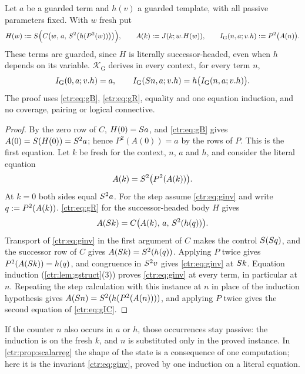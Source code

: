 \begin{theorem}\label{ctr:thm:giter}
Let $a$ be a guarded term and $h(v)$ a guarded template, with all passive parameters fixed.
With $w$ fresh put
\[
 H(w)\mathrel{:=}S\Bigl(C\bigl(w,\,a,\,S^2\bigl(h(P^2(w))\bigr)\bigr)\Bigr),\qquad
 A(k)\mathrel{:=} J(k;w.H(w)),\qquad
 I_{\mathrm G}(n,a;v.h)\mathrel{:=} P^2\bigl(A(n)\bigr).
\]
These terms are guarded, since $H$ is literally successor-headed, even when $h$ depends on
its variable. $\mathcal K_{\mathrm G}$ derives in every context, for every term $n$,
\begin{equation}\label{ctr:eq:gIC}
 I_{\mathrm G}(0,a;v.h)=a,\qquad I_{\mathrm G}(S n,a;v.h)=h\bigl(I_{\mathrm G}(n,a;v.h)\bigr).
\end{equation}
The proof uses \eqref{ctr:eq:gB}, \eqref{ctr:eq:gR}, equality and one equation induction,
and no coverage, pairing or logical connective.
\end{theorem}
\begin{proof}
By the zero row of $C$, $H(0)=S a$, and \eqref{ctr:eq:gB} gives $A(0)=S(H(0))=S^2a$;
hence $P^2(A(0))=a$ by the rows of $P$. This is the first equation. Let $k$ be fresh for
the context, $n$, $a$ and $h$, and consider the literal equation
\begin{equation}\label{ctr:eq:ginv}
 A(k)=S^2\bigl(P^2(A(k))\bigr).
\end{equation}
At $k=0$ both sides equal $S^2a$. For the step assume \eqref{ctr:eq:ginv} and write
$q\mathrel{:=} P^2(A(k))$. \eqref{ctr:eq:gR} for the successor-headed body $H$ gives
\begin{equation}\label{ctr:eq:gstep}
 A(S k)=C\bigl(A(k),\,a,\,S^2(h(q))\bigr).
\end{equation}
Transport of \eqref{ctr:eq:ginv} in the first argument of $C$ makes the control
$S(S q)$, and the successor row of $C$ gives $A(S k)=S^2(h(q))$. Applying $P$
twice gives $P^2(A(S k))=h(q)$, and congruence in $S^2v$ gives \eqref{ctr:eq:ginv} at
$S k$. Equation induction (\cref{ctr:lem:gstruct}(3)) proves \eqref{ctr:eq:ginv} at every
term, in particular at $n$. Repeating the step calculation with this instance at $n$ in
place of the induction hypothesis gives $A(S n)=S^2(h(P^2(A(n))))$, and applying $P$
twice gives the second equation of \eqref{ctr:eq:gIC}.
\end{proof}

If the counter $n$ also occurs in $a$ or $h$, those occurrences stay passive: the induction
is on the fresh $k$, and $n$ is substituted only in the proved instance. In
\cref{ctr:prop:scalarreg} the shape of the state is a consequence of one computation; here it
is the invariant \eqref{ctr:eq:ginv}, proved by one induction on a literal equation.

